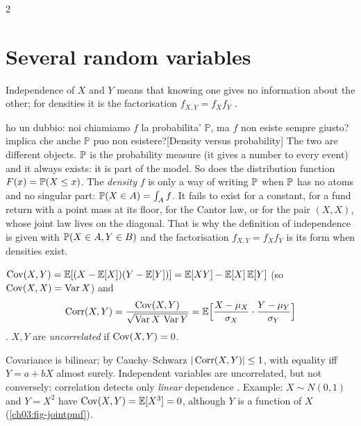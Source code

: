 \begin{paracol}{2}
\section{Several random variables}\label{ch03:sec-multi}

Independence of $X$ and $Y$ means that knowing one gives no information about the other; for densities
it is the factorisation $f_{X,Y}=f_Xf_Y$ .\begin{answer}{ho un dubbio: noi chiamiamo $f$ la probabilita' $\mathbb{P}$, ma $f$ non esiste sempre giusto? implica che anche $\mathbb{P}$ puo non esistere?}[Density versus probability]
The two are different objects. $\mathbb{P}$ is the probability measure (it gives a number to every event) and it always exists: it is part of
the model. So does the distribution function $F(x)=\mathbb{P}(X\le x)$. The \emph{density} $f$ is only a way of writing $\mathbb{P}$ when
$\mathbb{P}$ has no atoms and no singular part: $\mathbb{P}(X\in A)=\int_Af$. It fails to exist for a constant, for a fund return with a point mass
at its floor, for the Cantor law, or for the pair $(X,X)$, whose joint law lives on the diagonal. That is why the definition of
independence is given with $\mathbb{P}(X\in A,Y\in B)$ and the factorisation $f_{X,Y}=f_Xf_Y$ is its form when densities exist.
\end{answer}

\begin{definition}
$\operatorname{Cov}(X,Y)=\mathbb{E}[(X-\mathbb{E}[X])(Y-\mathbb{E}[Y])]=\mathbb{E}[XY]-\mathbb{E}[X]\,\mathbb{E}[Y]$ (so $\operatorname{Cov}(X,X)=\operatorname{Var} X$) and
\[
  \operatorname{Corr}(X,Y)=\frac{\operatorname{Cov}(X,Y)}{\sqrt{\operatorname{Var} X\,\operatorname{Var} Y}}=\mathbb{E}\Bigl[\frac{X-\mu_X}{\sigma_X}\cdot\frac{Y-\mu_Y}{\sigma_Y}\Bigr]
\]
. $X,Y$ are \emph{uncorrelated} if $\operatorname{Cov}(X,Y)=0$.
\end{definition}
Covariance is bilinear; by Cauchy--Schwarz $|\operatorname{Corr}(X,Y)|\le1$, with equality iff $Y=a+bX$ almost surely.
Independent variables are uncorrelated, but not conversely: correlation detects only \emph{linear}
dependence . Example: $X\sim N(0,1)$ and $Y=X^2$ have $\operatorname{Cov}(X,Y)=\mathbb{E}[X^3]=0$, although $Y$ is a
function of $X$ (\cref{ch03:fig-jointpmf}).


\end{paracol}

